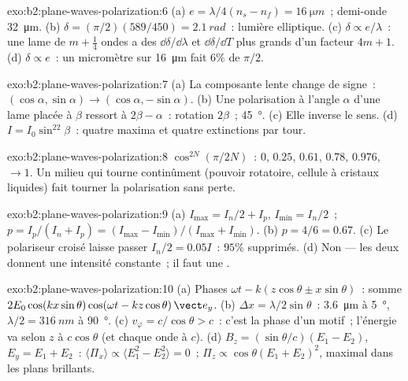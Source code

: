 \begin{solution}{exo:b2:plane-waves-polarization:6}
(a) $e = \lambda/4(n_s - n_f) = \qty{16}{\micro m}$~; demi-onde \qty{32}{\micro m}. (b) $\delta =
(\pi/2)(589/450) = \qty{2.1}{rad}$~: lumière elliptique. (c) $\delta \propto e/\lambda$~: une
lame de $m + \tfrac14$ ondes a des $\dd\delta/\dd\lambda$ et $\dd\delta/\dd T$ plus grands d'un facteur
$4m + 1$. (d) $\delta \propto e$~: un micromètre sur \qty{16}{\micro m} fait $6\%$ de $\pi/2$.
\end{solution}

\begin{solution}{exo:b2:plane-waves-polarization:7}
(a) La composante lente change de signe~: $(\cos\alpha, \sin\alpha) \to (\cos\alpha,
-\sin\alpha)$. (b) Une polarisation à l'angle $\alpha$ d'une lame placée à $\beta$ ressort
à $2\beta - \alpha$~: rotation $2\beta$~; \qty{45}{\degree}. (c) Elle inverse le
sens. (d) $I = I_0\sin^22\beta$~: quatre maxima et quatre extinctions
par tour.
\end{solution}

\begin{solution}{exo:b2:plane-waves-polarization:8}
$\cos^{2N}(\pi/2N)$~: $0$, $0.25$, $0.61$, $0.78$, $0.976$, $\to 1$. Un
milieu qui tourne continûment (pouvoir rotatoire, cellule à cristaux liquides)
fait tourner la polarisation sans perte.
\end{solution}

\begin{solution}{exo:b2:plane-waves-polarization:9}
(a) $I_{\max} = I_n/2 + I_p$, $I_{\min} = I_n/2$~; $p = I_p/(I_n + I_p) = (I_{\max} -
I_{\min})/(I_{\max} + I_{\min})$. (b) $p = 4/6 = 0.67$. (c) Le polariseur croisé
laisse passer $I_n/2 = 0.05I$~: $95\%$ supprimés. (d) Non --- les deux donnent une intensité
constante~; il faut une .
\end{solution}

\begin{solution}{exo:b2:plane-waves-polarization:10}
(a) Phases $\omega t - k(z\cos\theta \pm x\sin\theta)$~: somme $2E_0\cos(kx\sin\theta)\cos(\omega t
- kz\cos\theta)\,\vect e_y$. (b) $\Delta x = \lambda/2\sin\theta$~: \qty{3.6}{\micro m} à \qty{5}{\degree},
$\lambda/2 = \qty{316}{nm}$ à \qty{90}{\degree}. (c) $v_\varphi = c/\cos\theta > c$~: c'est la
phase d'un motif~; l'énergie va selon $z$ à $c\cos\theta$ (et chaque onde à $c$).
(d) $B_z = (\sin\theta/c)(E_1 - E_2)$, $E_y = E_1 + E_2$~: $\langle\Pi_x\rangle \propto
\langle E_1^2 - E_2^2\rangle = 0$~; $\Pi_z \propto \cos\theta(E_1 + E_2)^2$, maximal dans les
plans brillants.
\end{solution}

